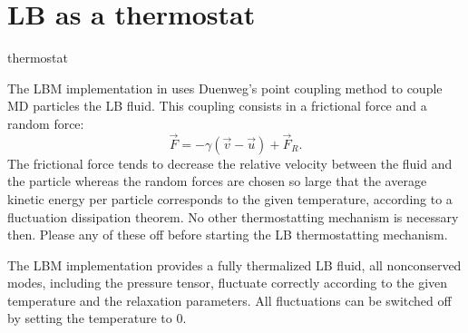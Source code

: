 \section{LB as a thermostat}
\begin{essyntax}
  thermostat  
  \begin{features}
  \end{features}
\end{essyntax}
The LBM implementation in \es uses Duenweg's point coupling method
to couple MD particles the LB fluid. This coupling consists
in a frictional force and a random force:
\begin{equation*}
  \vec{F} = -\gamma \left(\vec{v}-\vec{u}\right) + \vec{F}_R.
\end{equation*}
The frictional force tends to decrease the relative velocity
between the fluid and the particle whereas the random forces are chosen
so large that the average kinetic energy per particle corresponds to
the given temperature, according to a fluctuation dissipation theorem.
No other thermostatting mechanism is necessary then. Please any of these
off before starting the LB thermostatting mechanism.

The LBM implementation provides a fully thermalized LB fluid, \ie all
nonconserved modes, including the pressure tensor, fluctuate correctly
according to the given temperature and the relaxation parameters. All
fluctuations can be switched off by setting the temperature to 0.



